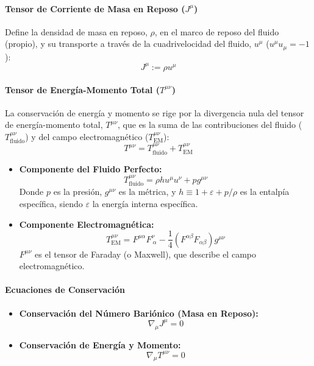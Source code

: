 \paragraph{Tensor de Corriente de Masa en Reposo ($J^\mu$)}
Define la densidad de masa en reposo, $\rho$, en el marco de reposo del fluido (propio), y su transporte a través de la cuadrivelocidad del fluido, $u^\mu$ ($u^\mu u_\mu = -1$):
\begin{equation}
J^\mu := \rho u^\mu
\end{equation}

\paragraph{Tensor de Energía-Momento Total ($T^{\mu\nu}$)}
La conservación de energía y momento se rige por la divergencia nula del tensor de energía-momento total, $T^{\mu\nu}$, que es la suma de las contribuciones del fluido ($T^{\mu\nu}_{\text{fluido}}$) y del campo electromagnético ($T^{\mu\nu}_{\text{EM}}$):
\begin{equation}
T^{\mu\nu} = T^{\mu\nu}_{\text{fluido}} + T^{\mu\nu}_{\text{EM}}
\end{equation}
\begin{itemize}
    \item \textbf{Componente del Fluido Perfecto:}
    $$ T^{\mu\nu}_{\text{fluido}} = \rho h u^\mu u^\nu + p g^{\mu\nu} $$
    Donde $p$ es la presión, $g^{\mu\nu}$ es la métrica, y $h \equiv 1 + \varepsilon + p/\rho$ es la entalpía específica, siendo $\varepsilon$ la energía interna específica.
    \item \textbf{Componente Electromagnética:}
    $$ T^{\mu\nu}_{\text{EM}} = F^{\mu\alpha} F^\nu_{\ \alpha} - \frac{1}{4} (F^{\alpha\beta} F_{\alpha\beta}) g^{\mu\nu} $$
    $F^{\mu\nu}$ es el tensor de Faraday (o Maxwell), que describe el campo electromagnético.
\end{itemize}

\paragraph{Ecuaciones de Conservación}
\begin{itemize}
    \item \textbf{Conservación del Número Bariónico (Masa en Reposo):}
    \begin{equation}
        \nabla_\mu J^\mu = 0
    \end{equation}
    \item \textbf{Conservación de Energía y Momento:}
    \begin{equation}
        \nabla_\mu T^{\mu\nu} = 0
    \end{equation}
\end{itemize}

